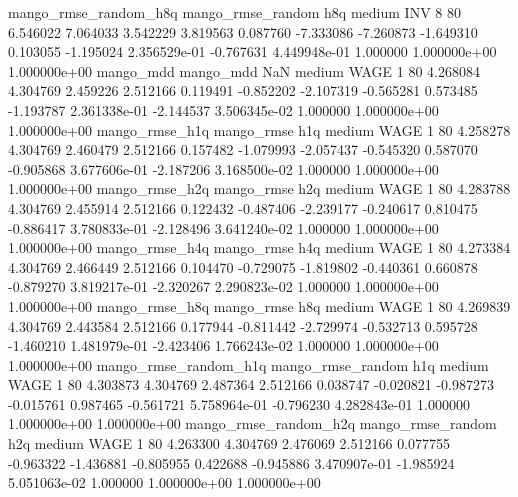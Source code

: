 mango_rmse_random_h8q mango_rmse_random                  h8q     medium      INV                 8 80  6.546022       7.064033 3.542229       3.819563    0.087760     -7.333086     -7.260873    -1.649310       0.103055 -1.195024 2.356529e-01    -0.767631   4.449948e-01            1.000000    1.000000e+00        1.000000e+00
            mango_mdd         mango_mdd                  NaN     medium     WAGE                 1 80  4.268084       4.304769 2.459226       2.512166    0.119491     -0.852202     -2.107319    -0.565281       0.573485 -1.193787 2.361338e-01    -2.144537   3.506345e-02            1.000000    1.000000e+00        1.000000e+00
       mango_rmse_h1q        mango_rmse                  h1q     medium     WAGE                 1 80  4.258278       4.304769 2.460479       2.512166    0.157482     -1.079993     -2.057437    -0.545320       0.587070 -0.905868 3.677606e-01    -2.187206   3.168500e-02            1.000000    1.000000e+00        1.000000e+00
       mango_rmse_h2q        mango_rmse                  h2q     medium     WAGE                 1 80  4.283788       4.304769 2.455914       2.512166    0.122432     -0.487406     -2.239177    -0.240617       0.810475 -0.886417 3.780833e-01    -2.128496   3.641240e-02            1.000000    1.000000e+00        1.000000e+00
       mango_rmse_h4q        mango_rmse                  h4q     medium     WAGE                 1 80  4.273384       4.304769 2.466449       2.512166    0.104470     -0.729075     -1.819802    -0.440361       0.660878 -0.879270 3.819217e-01    -2.320267   2.290823e-02            1.000000    1.000000e+00        1.000000e+00
       mango_rmse_h8q        mango_rmse                  h8q     medium     WAGE                 1 80  4.269839       4.304769 2.443584       2.512166    0.177944     -0.811442     -2.729974    -0.532713       0.595728 -1.460210 1.481979e-01    -2.423406   1.766243e-02            1.000000    1.000000e+00        1.000000e+00
mango_rmse_random_h1q mango_rmse_random                  h1q     medium     WAGE                 1 80  4.303873       4.304769 2.487364       2.512166    0.038747     -0.020821     -0.987273    -0.015761       0.987465 -0.561721 5.758964e-01    -0.796230   4.282843e-01            1.000000    1.000000e+00        1.000000e+00
mango_rmse_random_h2q mango_rmse_random                  h2q     medium     WAGE                 1 80  4.263300       4.304769 2.476069       2.512166    0.077755     -0.963322     -1.436881    -0.805955       0.422688 -0.945886 3.470907e-01    -1.985924   5.051063e-02            1.000000    1.000000e+00        1.000000e+00
